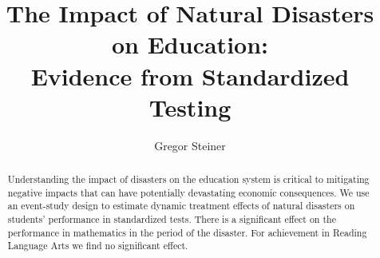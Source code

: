 \documentclass[11pt]{article}
\title{The Impact of Natural Disasters on Education: \\ Evidence from Standardized Testing}
\author{Gregor Steiner}
\begin{document}
\maketitle

\begin{abstract}
	\centering
	\begin{minipage}{\dimexpr\paperwidth-10cm}
		Understanding the impact of disasters on the education system is critical to mitigating negative impacts that can have potentially devastating economic consequences. We use an event-study design to estimate dynamic treatment effects of natural disasters on students' performance in standardized tests. There is a significant effect on the performance in mathematics in the period of the disaster. For achievement in Reading Language Arts we find no significant effect.
	\end{minipage}
\end{abstract}












\appendix




\end{document}
